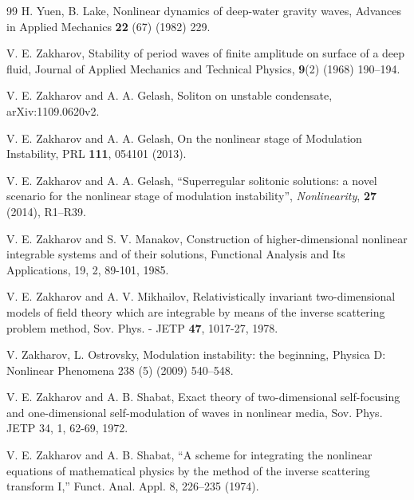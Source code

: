 \documentclass[12pt]{article}
\begin{document}
\begin{thebibliography}{99}
 H. Yuen, B. Lake, Nonlinear dynamics of deep-water gravity waves, Advances in Applied Mechanics {\bf 22} (67) (1982) 229.

 V. E. Zakharov, Stability of period waves of finite amplitude on surface of a deep fluid, Journal of Applied Mechanics and Technical Physics, {\bf 9}(2) (1968) 190--194.

 V. E. Zakharov and A. A. Gelash, Soliton on unstable condensate, arXiv:1109.0620v2.

 V. E. Zakharov and A. A. Gelash, On the nonlinear stage of Modulation Instability, PRL {\bf 111}, 054101 (2013).

  V. E. Zakharov and A. A. Gelash, ``Superregular solitonic solutions: a novel scenario for the nonlinear stage of modulation instability'', \textit{Nonlinearity}, \textbf{27} (2014), R1--R39.

  V. E. Zakharov and S. V. Manakov, Construction of higher-dimensional nonlinear integrable systems and of their solutions, Functional Analysis and Its Applications, 19, 2, 89-101, 1985. 

 V. E. Zakharov and A. V. Mikhailov, Relativistically invariant two-dimensional models of field theory which are integrable by means of the inverse scattering problem method, Sov. Phys. - JETP {\bf 47}, 1017-27, 1978.

 V. Zakharov, L. Ostrovsky, Modulation instability: the beginning, Physica D: Nonlinear Phenomena 238 (5) (2009) 540--548.

 V. E. Zakharov and A. B. Shabat, Exact theory of two-dimensional self-focusing and one-dimensional self-modulation of waves in nonlinear media, Sov. Phys. JETP 34, 1, 62-69, 1972.

 V. E. Zakharov and A. B. Shabat, “A scheme for integrating the nonlinear equations of mathematical physics by the method of the inverse scattering transform I,” Funct. Anal. Appl. 8, 226--235 (1974).


\end{thebibliography}
\end{document}
